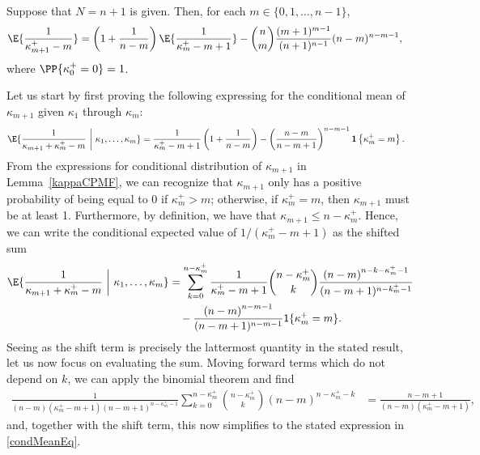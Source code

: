 \begin{lemma}\label{meanRecur}
Suppose that $N = n +1$ is given. Then, for each $m \in \{0, 1, \dots, n - 1\}$,
\begin{align}
\E{\frac{1}{\kappa_{m+1}^+ - m} }
&=
\left(1 + \frac{1}{n-m}\right)\E{\frac{1}{\kappa_m^+ - m + 1}}
-
{n \choose m}\frac{(m+1)^{m-1}}{(n+1)^{n-1}}(n-m)^{n-m-1}
,
\end{align}
where $\PP{\kappa_0^+ = 0} = 1$.
\end{lemma}
 Let us start by first proving the following expressing for the conditional mean of $\kappa_{m+1}$ given $\kappa_1$ through $\kappa_m$:
\begin{align}
\E{\frac{1}{\kappa_{m+1} + \kappa_m^+ - m} ~\bigg|~ \kappa_1, \dots, \kappa_m}
&=
\frac{1}{\kappa_m^+ - m + 1}\left(1 + \frac{1}{n-m}\right)
-
\left(\frac{n-m}{n-m+1}\right)^{n-m-1}\mathbf{1}\left\{ \kappa_m^+ = m\right\}
\label{condMeanEq}
.
\end{align}
From the expressions for conditional distribution of $\kappa_{m+1}$ in Lemma~\ref{kappaCPMF}, we can recognize that $\kappa_{m+1}$ only has a positive probability of being equal to 0 if $\kappa_m^+ > m$; otherwise, if $\kappa_m^+ = m$, then $\kappa_{m+1}$ must be at least 1. Furthermore, by definition, we have that $\kappa_{m+1} \leq n - \kappa_m^+$. Hence, we can write the conditional expected value of $1/(\kappa_m^+ - m + 1)$ as the shifted sum
\begin{align}
\E{\frac{1}{\kappa_{m+1} + \kappa_m^+ - m} ~\bigg|~ \kappa_1, \dots, \kappa_m}
&=
\sum_{k=0}^{n-\kappa_m^+}
\frac{1}{\kappa_m^+ - m + 1}
{n - \kappa_m^+ \choose k}
\frac{\left(n-m\right)^{n-k-\kappa_{m}^+-1}}{(n-m+1)^{n-k_m^+-1}}
\nonumber
\\
&
\quad
-
\frac{\left(n-m\right)^{n-m-1}}{(n-m+1)^{n-m-1}}
\mathsf{1}\{\kappa_m^+ = m\}
.
\end{align}
Seeing as the shift term is precisely the lattermost quantity in the stated result, let us now focus on evaluating the sum. Moving forward terms which do not depend on $k$, we can apply the binomial theorem and find
\begin{align}
\frac{1}{(n-m)(\kappa_m^+ - m + 1)(n-m+1)^{n-\kappa_m^+-1}}
\sum_{k=0}^{n-\kappa_m^+}
{n - \kappa_m^+ \choose k}
\left(n-m\right)^{n-\kappa_{m}^+-k}
&=
\frac{n-m+1}{(n-m)(\kappa_m^+ - m + 1)}
,
\end{align}
and, together with the shift term, this now simplifies to the stated expression in \eqref{condMeanEq}.

